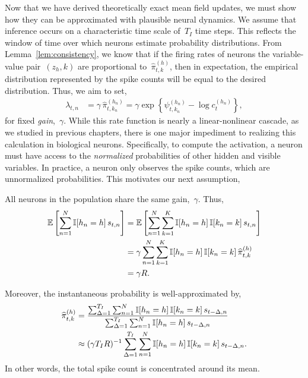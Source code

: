 
Now that we have derived theoretically exact mean field updates, we
must show how they can be approximated with plausible neural dynamics.
We assume that inference occurs on a characteristic time scale of~$T_I$
time steps. This reflects the window of time over which neurons estimate
probability distributions.
From Lemma~\ref{lem:consistency}, we know that if the firing rates of
neurons the variable-value pair~${(z_h,k)}$ are proportional
to~$\widehat{\pi}_{t,k}^{(h)}$, then in expectation, the empirical
distribution represented by the spike counts will be equal to the
desired distribution. Thus, we aim to set,
\begin{align}
  \lambda_{t,n} &= \gamma \, \widehat{\pi}_{t,k_n}^{(h_n)}
  = \gamma \exp \left \{\psi_{t,k_n}^{(h_n)} -\log c_{t}^{(h_n)} \right \},
\end{align}
for fixed \emph{gain},~$\gamma$. While this rate function is
nearly a linear-nonlinear cascade, as we studied in previous
chapters, there is one major impediment to realizing this
calculation in biological neurons. Specifically, to compute
the activation, a neuron must have access to the \emph{normalized}
probabilities of other hidden and visible variables. In practice,
a neuron only observes the spike counts, which are
unnormalized probabilities. This motivates our next assumption,

\begin{assumption}
  All neurons in the population share the same gain,~$\gamma$.
  Thus,
  \begin{align}
    \mathbb{E} \left[ \sum_{n=1}^N \mathbb{I}[h_n=h] \, s_{t,n} \right]
    &= \mathbb{E} \left[ \sum_{n=1}^N \sum_{k=1}^K \mathbb{I}[h_n=h] \, \mathbb{I}[k_n=k] \,s_{t,n} \right] \\
    &= \gamma \sum_{n=1}^N \sum_{k=1}^K \mathbb{I}[h_n=h] \, \mathbb{I}[k_n=k] \, \widehat{\pi}_{t,k}^{(h)} \\
    &= \gamma R.
  \end{align}

  Moreover, the instantaneous probability is well-approximated by,
  \begin{align}
      \widehat{\pi}_{t,k}^{(h)} &=
  \frac{\sum_{\Delta=1}^{T_I} \sum_{n=1}^N \mathbb{I}[h_n=h] \, \mathbb{I}[k_n=k] \, s_{t-\Delta ,n}}
       {\sum_{\Delta=1}^{T_I} \sum_{n=1}^N \mathbb{I}[h_n=h] \, s_{t-\Delta ,n}} \\
       &\approx (\gamma T_I R)^{-1} \sum_{\Delta=1}^{T_I} \sum_{n=1}^N \mathbb{I}[h_n=h] \, \mathbb{I}[k_n=k] \, s_{t-\Delta,n}.
  \end{align}
  In other words, the total spike count is concentrated around its mean.
\end{assumption}

